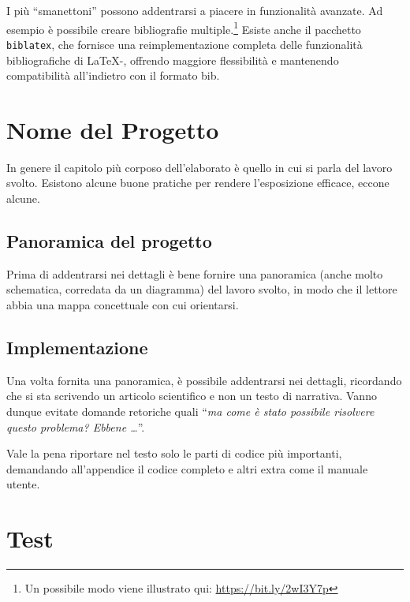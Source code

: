 \documentclass[12pt]{report}
\begin{document}
I pi\`u ``smanettoni'' possono addentrarsi a piacere in funzionalit\`a avanzate. Ad esempio \`e possibile creare bibliografie multiple.\footnote{Un possibile modo viene illustrato qui: \url{https://bit.ly/2wI3Y7p}}
Esiste anche il pacchetto \texttt{biblatex}, che fornisce una reimplementazione completa delle funzionalit\`a bibliografiche di \LaTeX-, offrendo maggiore flessibilit\`a e mantenendo compatibilit\`a all'indietro con il formato bib.





% 
% 

\chapter{Nome del Progetto}
\label{cap4}

In genere il capitolo più corposo dell'elaborato è quello in cui si parla del lavoro svolto. Esistono alcune buone pratiche per rendere l'esposizione efficace, eccone alcune.

\section{Panoramica del progetto}

Prima di addentrarsi nei dettagli è bene fornire una panoramica (anche molto schematica, corredata da un diagramma) del lavoro svolto, in modo che il lettore abbia una mappa concettuale con cui orientarsi.

\section{Implementazione}

Una volta fornita una panoramica, è possibile addentrarsi nei dettagli, ricordando che si sta scrivendo un articolo scientifico e non un testo di narrativa. Vanno dunque evitate domande retoriche quali ``\textit{ma come è stato possibile risolvere questo problema? Ebbene \ldots}''.

Vale la pena riportare nel testo solo le parti di codice più importanti, demandando all'appendice il codice completo e altri extra come il manuale utente.

% 
% 

\chapter{Test}
\label{cap5}
\end{document}
